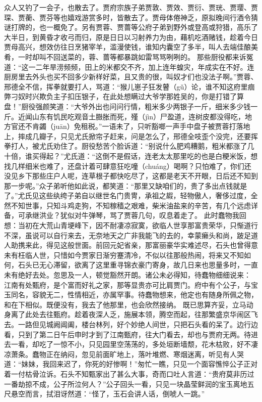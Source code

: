 \documentclass[12pt,oneside]{book}
\begin{document}
众人又钓了一会子，也散去了。贾府宗族子弟贾敦、贾效、贾衍、贾珖、贾璎、贾琛、贾蘅、贾芬等也嬉戏游赏多时，皆散去了。贾母体倦神乏，原拟晚间行酒令猜谜打牌的，也一概免了。另有贾蓉、贾蔷等公府子弟到野外或登高或狩猎，高乐了大半日，到黄昏才收弓而归，原是日日以习射养力为由，藉机吃酒赌钱，趁着今日贾母高兴，想效仿往日烹猪宰羊，滥漫使钱，谁知内囊空了多半，叫人去端佳酿美肴，一时却叫不回送菜的，蓉、蔷等都暴跳如雷骂骂咧咧的。
那些厨役都来诉冤道：“这一二年旱涝频频，田上的米都交不齐，加上连年蝗灾，年成实在不好。连厨房里去外头也买不回多少新样好菜，且又贵的很，叫奴才们也没法子啊。”贾蓉、邢德全不信，挥拳就要打人，骂道：“猴儿崽子狂发瞽（gǔ）论，谁不知这府里痼弊刁奴时兴欺负主子扣压银子，在此处想瞒过大爷学那姓吴的，你是打错了算盘！”厨役强颜笑道：“大爷外出也问问行情，粗米多少两银子一斤，细米多少钱一斤。近闻山东有饥民吃观音土臌胀而死，殣（jìn）尸盈道，连树皮都没得吃，地方官还不肯蠲（juān）免租税。”一语未了，只听豁啷一声手中盘子被贾蓉打落地上，摔成几瓣子，只见尤氏掀帘子赶来，问是怎么了，邢德全吱歪个没完，还要挥拳打人，被尤氏劝住了。厨役愁苦个脸诉道：“别说什么肥鸡糟鹅，粗米都涨了几十倍，谁买得起？”尤氏道：“这倒不是假话，连老太太那里吃的也是白粳米饭，想找几样细米也难了，还盘计着可肆意狂吃噇（chuáng）喝啊？只怕难了，你们还没见乡下那些庄户人呢，连草根子都快吃尽了，这都是老天不开眼，日后还不知到那一步呢。”众子弟听他如此说，都笑道：“那里又缺咱们的，贵了多出点钱就是了。”尤氏见这些纨绔子弟自以继世名门贵冑，承祖之嘏，轻物傲人，奢侈过度，全然不知世事，只知斗鸡走狗，不知稼穑之艰难，柴米油盐来的辛苦，有几个远虑详备，可承继洪业？犹似对牛弹琴，骂了贾蓉几句，叹息着走了。
此时蠢物我回想：当初在大荒山青埂峰下，因不耐凄凉寂寞，欲临人世享那富贵荣华，只惭道行不深，虽说可以自行来去，无奈地天之广非我能飞的去的，幸蒙癞头和尚，跛足道人助携来此，得见这般世面。前回元妃省亲，那富丽豪华实难述尽，石头也曾得意未有枉临人世，只惜如今贾家日渐穷蹇清冷，不似以往那般热闹，将来又不知如何，石头已无心滞留，欲离了这里重寻锦衣豪门寄身，故几日来也思量多时，一直未有绝好去处。忽思及一人，顿觉豁然开朗。诸公未必得知，待蠢物细细说来：
江南有处甄府，是个富而好礼之家，那等显贵亦可比肩贾门。府中有个公子，与宝玉同名，容貌无二，性情相近，亦属罕事。待蠢物想来，他定也有随身所佩之物，和在下相似。既便没有，我去了他那里，也会欣然接纳。
既已思算齐妥，立马动身离了此处去往甄府。趁着夜深人乏，施展本领，腾空而起，往那繁盛京华闹区飞去。一路但见城阙阊阖，楼台林列，好个妙绝人间世，只把石头看的呆了。边行边看，只到了第二日午后申时才到了江南甄府，往大门看去，却也与贾府无两。待进去一看，却吃了一惊不小，只见园里空荡荡的，多处垣断墙颓，花木枯败，好不凄凉萧条。蠢物正在纳闷，忽见前面旷地上，落叶堆燃、寒烟迷离，听见有人哭道：“妹妹，我回来迟了，你死的好惨啊！”匆忙一瞧，只见一个面容憔悴公子正对着一付枯骨泣诉。石头不知甄家出了甚么大事，奇而口吐人言道：“贵府莫非历过一番劫掠不成，公子所泣何人？”公子回头一看，只见一块晶莹鲜润的宝玉离地五尺悬空而言，拭泪讶然道：“怪了，玉石会讲人话，倒唬人一跳。”
\end{document}

